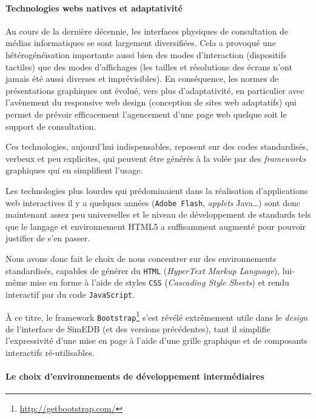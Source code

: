 \paragraph*{Technologies webs \og natives\fg{}  et adaptativité}

Au cours de la dernière décennie, les interfaces physiques de consultation de médias informatiques se sont largement diversifiées.
Cela a provoqué une hétérogénéisation importante aussi bien des modes d'interaction (dispositifs \og tactiles\fg{}) que des modes d'affichages (les tailles et résolutions des écrans n'ont jamais été aussi diverses et imprévisibles).
En conséquence, les normes de présentations graphiques ont évolué, vers plus d'\fg{}adaptativité\fg{}, en particulier avec l'avènement du \og responsive web design\fg{} (\og conception de sites web adaptatifs\fg{}) qui permet de prévoir efficacement l'agencement d'une page web quelque soit le support de consultation.

Ces technologies, aujourd'hui indispensables, reposent sur des codes standardisés, verbeux et peu explicites, qui peuvent être générés à la volée par des \textit{frameworks} graphiques qui en simplifient l'usage.

Les technologies plus lourdes qui prédominaient dans la réalisation d'applications web interactives il y a quelques années (\texttt{Adobe Flash}, \textit{applets} Java\ldots) sont donc maintenant assez peu universelles et le niveau de développement de standards tels que le langage et environnement HTML5 a suffisamment augmenté pour pouvoir justifier de s'en passer.

Nous avons donc fait le choix de nous concentrer sur des environnements standardisés, capables de générer du \texttt{HTML} (\og \textit{HyperText Markup Language}\fg{}), lui-même mise en forme à l'aide de styles \texttt{CSS} (\og \textit{Cascading Style Sheets}\fg{}) et rendu interactif par du code \texttt{JavaScript}.

À ce titre, le framework \texttt{Bootstrap}\footnote{\href{http://getbootstrap.com/}{http://getbootstrap.com/}} s'est révélé extrêmement utile dans le \textit{design} de l'interface de SimEDB (et des versions précédentes), tant il simplifie l'expressivité d'une mise en page à l'aide d'une grille graphique et de composants interactifs ré-utilisables.

\paragraph*{Le choix d'environnements de développement intermédiaires}

